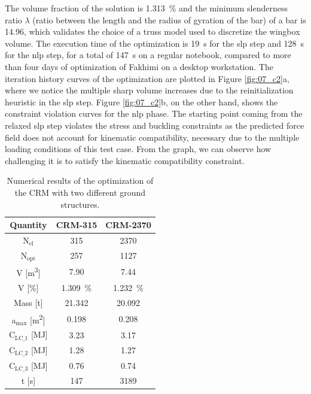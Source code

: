     The volume fraction of the solution is \qty{1.313}{\percent} and the minimum slenderness ratio $\lambda$ (ratio between the length and the radius of gyration of the bar) of a bar is 14.96, which validates the choice of a truss model used to discretize the wingbox volume. The execution time of the optimization is \qty{19}{s} for the \gls{slp} step and \qty{128}{s} for the \gls{nlp} step, for a total of \qty{147}{s} on a regular notebook, compared to more than four days of optimization of Fakhimi \cite{fakhimi_discrete_2021} on a desktop workstation. The iteration history curves of the optimization are plotted in Figure \ref{fig:07_c2}a, where we notice the multiple sharp volume increases due to the reinitialization heuristic in the \gls{slp} step. Figure \ref{fig:07_c2}b, on the other hand, shows the constraint violation curves for the \gls{nlp} phase. The starting point coming from the relaxed \gls{slp} step violates the stress and buckling constraints as the predicted force field does not account for kinematic compatibility, necessary due to the multiple loading conditions of this test case. From the graph, we can observe how challenging it is to satisfy the kinematic compatibility constraint.

    \begin{table}
        \small
        \centering
        \begin{tabular}{ccc}
        \toprule
        \textbf{Quantity} & \textbf{CRM-315} & \textbf{CRM-2370} \\ \midrule
        N$_{\text{el}}$          & 315               & 2370               \\
        N$_{\text{opt}}$           & 257                  &  1127              \\
        V [\unit{\meter^3}]             &  7.90                 &  7.44             \\
        V [\unit{\%}]             &   \qty{1.309}{\%}                & \qty{1.232}{\%}               \\
        Mass [\unit{\tonne}]               &   21.342                & 20.092     \\
        a$_{\text{max}}$ [\unit{\meter^2}]           &  0.198                 & 0.208              \\
        C$_\text{LC\_1}$ [\unit{\mega \joule}]                &  3.23                 &  3.17              \\
        C$_\text{LC\_2}$ [\unit{\mega \joule}]                &   1.28                &  1.27              \\
        C$_\text{LC\_3}$ [\unit{\mega \joule}]                &   0.76                &  0.74              \\
        t [\unit{\second}]                & 147                  & 3189   \\ \bottomrule            
        \end{tabular}
        \caption{Numerical results of the optimization of the CRM with two different ground structures.}
        \label{tab:07_wing-res}
    \end{table}

